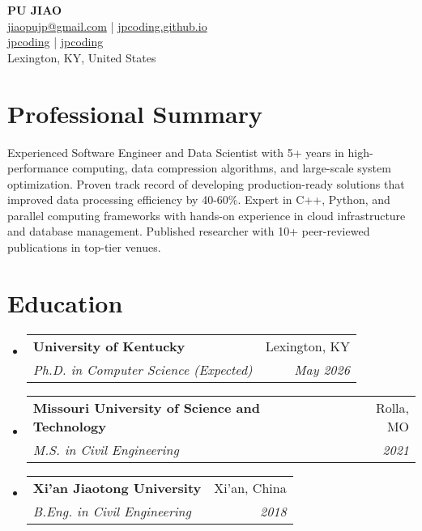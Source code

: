 \documentclass[a4paper,11pt]{article}
\makeatletter
\newcommand{\resumeSubheading}[4]{
\vspace{0.5mm}\item
    \begin{tabular*}{0.98\textwidth}[t]{l@{\extracolsep{\fill}}r}
        \textbf{#1} & #2 \\
        \textit{#3} & \textit{\footnotesize{#4}}\\
    \end{tabular*}
    \vspace{-2.4mm}
}
\newcommand{\resumeSubHeadingListStart}{\begin{itemize}[leftmargin=*,labelsep=1mm]}
\newcommand{\resumeSubHeadingListEnd}{\end{itemize}\vspace{2mm}}
\newcommand{\socialicon}[1]{\raisebox{-0.05em}{\resizebox{!}{1em}{#1}}}
\newcommand{\headerfontiii}{\fontfamily{ppl}\selectfont} %
\makeatother
\begin{document}
\headerfontiii

\begin{center}
    {\Huge\textbf{PU JIAO}}\\[0.5em]
    \small{
    \href{mailto:jiaopujp@gmail.com}{jiaopujp@gmail.com} | 
    \href{https://jpcoding.github.io/}{jpcoding.github.io}
    }\\[0.3em]
    \small{
    \socialicon{\faLinkedin} \href{https://www.linkedin.com/in/jpcoding}{jpcoding} | 
    \socialicon{\faGithub} \href{https://github.com/jpcoding}{jpcoding}
    }\\[0.2em]
    \small{Lexington, KY, United States}
\end{center}

\vspace{-4mm}

\section{\textbf{Professional Summary}}
\vspace{-0.4mm}
\small{
Experienced Software Engineer and Data Scientist with 5+ years in high-performance computing, data compression algorithms, and large-scale system optimization. Proven track record of developing production-ready solutions that improved data processing efficiency by 40-60\%. Expert in C++, Python, and parallel computing frameworks with hands-on experience in cloud infrastructure and database management. Published researcher with 10+ peer-reviewed publications in top-tier venues.
}
\vspace{-2mm}

\section{\textbf{Education}}
\vspace{-0.4mm}
\resumeSubHeadingListStart

\resumeSubheading
{University of Kentucky}{Lexington, KY}
{Ph.D. in Computer Science (Expected)}{May 2026}

\resumeSubheading
{Missouri University of Science and Technology}{Rolla, MO}
{M.S. in Civil Engineering}{2021}

\resumeSubheading
{Xi'an Jiaotong University}{Xi'an, China}
{B.Eng. in Civil Engineering}{2018}

\resumeSubHeadingListEnd
\vspace{-6mm}
\end{document}
